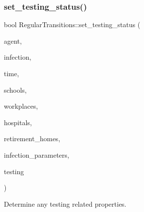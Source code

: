 \subsubsection{\texorpdfstring{set\+\_\+testing\+\_\+status()}{set\_testing\_status()}}
{\footnotesize\ttfamily bool Regular\+Transitions\+::set\+\_\+testing\+\_\+status (\begin{DoxyParamCaption}\item[{\hyperlink{classAgent}{Agent} \&}]{agent,  }\item[{\hyperlink{classInfection}{Infection} \&}]{infection,  }\item[{const double}]{time,  }\item[{std\+::vector$<$ \hyperlink{classSchool}{School} $>$ \&}]{schools,  }\item[{std\+::vector$<$ \hyperlink{classWorkplace}{Workplace} $>$ \&}]{workplaces,  }\item[{std\+::vector$<$ \hyperlink{classHospital}{Hospital} $>$ \&}]{hospitals,  }\item[{std\+::vector$<$ \hyperlink{classRetirementHome}{Retirement\+Home} $>$ \&}]{retirement\+\_\+homes,  }\item[{const std\+::map$<$ std\+::string, double $>$ \&}]{infection\+\_\+parameters,  }\item[{const \hyperlink{classTesting}{Testing} \&}]{testing }\end{DoxyParamCaption})}



Determine any testing related properties. 

\mbox{\label{classRegularTransitions_a81fdcd87f0c66b867eefb351484a6852}} 

